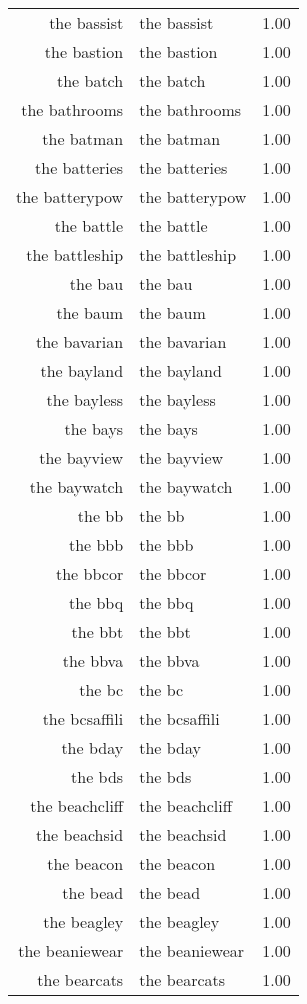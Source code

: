\begin{table}[ht]
\begin{tabular}{rlr}
  the bassist & the bassist & 1.00 \\ 
  the bastion & the bastion & 1.00 \\ 
  the batch & the batch & 1.00 \\ 
  the bathrooms & the bathrooms & 1.00 \\ 
  the batman & the batman & 1.00 \\ 
  the batteries & the batteries & 1.00 \\ 
  the batterypow & the batterypow & 1.00 \\ 
  the battle & the battle & 1.00 \\ 
  the battleship & the battleship & 1.00 \\ 
  the bau & the bau & 1.00 \\ 
  the baum & the baum & 1.00 \\ 
  the bavarian & the bavarian & 1.00 \\ 
  the bayland & the bayland & 1.00 \\ 
  the bayless & the bayless & 1.00 \\ 
  the bays & the bays & 1.00 \\ 
  the bayview & the bayview & 1.00 \\ 
  the baywatch & the baywatch & 1.00 \\ 
  the bb & the bb & 1.00 \\ 
  the bbb & the bbb & 1.00 \\ 
  the bbcor & the bbcor & 1.00 \\ 
  the bbq & the bbq & 1.00 \\ 
  the bbt & the bbt & 1.00 \\ 
  the bbva & the bbva & 1.00 \\ 
  the bc & the bc & 1.00 \\ 
  the bcsaffili & the bcsaffili & 1.00 \\ 
  the bday & the bday & 1.00 \\ 
  the bds & the bds & 1.00 \\ 
  the beachcliff & the beachcliff & 1.00 \\ 
  the beachsid & the beachsid & 1.00 \\ 
  the beacon & the beacon & 1.00 \\ 
  the bead & the bead & 1.00 \\ 
  the beagley & the beagley & 1.00 \\ 
  the beaniewear & the beaniewear & 1.00 \\ 
  the bearcats & the bearcats & 1.00 \\ 

\end{tabular}
\end{table}
